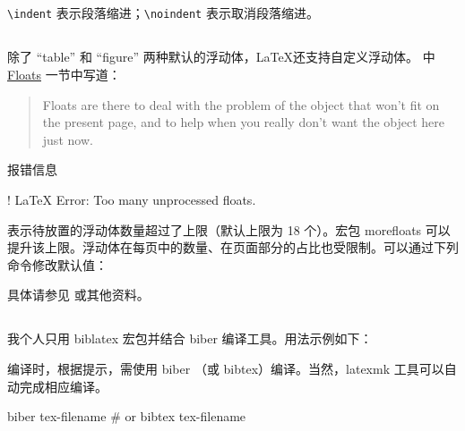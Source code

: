\subsection{}
\verb+\indent+ 表示段落缩进；\verb+\noindent+ 表示取消段落缩进。

\subsection{}
除了 ``table'' 和 ``figure'' 两种默认的浮动体，\LaTeX 还支持自定义浮动体。\cite{wiki-floats} 中\href{https://en.wikibooks.org/wiki/LaTeX/Floats,\_Figures\_and\_Captions\#Floats}{Floats} 一节中写道：
\begin{quote}
  Floats are there to deal with the problem of the object that won't fit on the present page, and to help when you really don't want the object here just now. 
\end{quote}

报错信息
\begin{bashlst}
! LaTeX Error: Too many unprocessed floats.
\end{bashlst}
表示待放置的浮动体数量超过了上限（默认上限为 18 个）。宏包 morefloats 可以提升该上限。浮动体在每页中的数量、在页面部分的占比也受限制。可以通过下列命令修改默认值：
\begin{texlst}
\setcounter{topnumber}{2}
\setcounter{bottomnumber}{2}
\setcounter{totalnumber}{4}
\renewcommand{\topfraction}{0.85}
\renewcommand{\bottomfraction}{0.85}
\renewcommand{\textfraction}{0.15}
\renewcommand{\floatpagefraction}{0.7}
\end{texlst}
具体请参见 \cite{placement} 或其他资料。

\subsection{}
我个人只用 biblatex 宏包并结合 biber 编译工具。用法示例如下：
\begin{texlst}
\usepackage[]{biblatex}


\printbibliography[]
\end{texlst}
编译时，根据提示，需使用 biber （或 bibtex）编译。当然，latexmk 工具可以自动完成相应编译。
\begin{bashlst}
biber tex-filename
# or bibtex tex-filename
\end{bashlst}